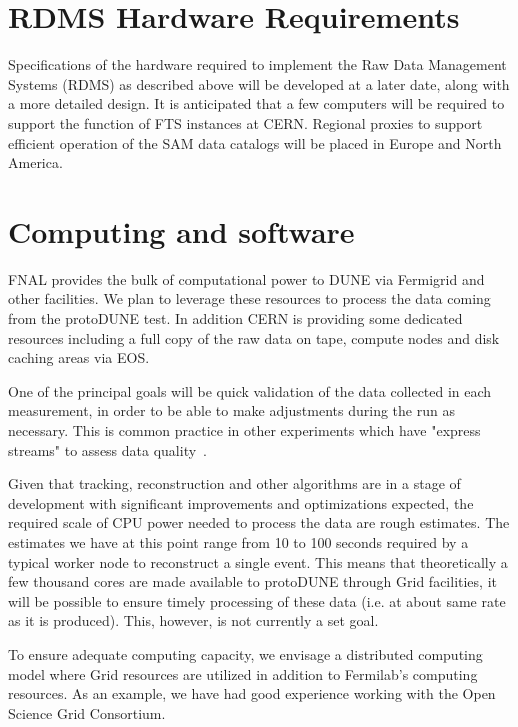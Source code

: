 \documentclass[12pt]{article}
\begin{document}
\section{RDMS Hardware Requirements}
Specifications of the hardware required to implement the Raw Data Management Systems (RDMS) as described above will be developed at a later date,
along with a more detailed design. It is anticipated that a few computers will be required to support the function of FTS instances at CERN.
Regional proxies to support efficient operation of the SAM data catalogs will be placed in Europe and North America.

\section{Computing and software}


FNAL provides the bulk of computational power to DUNE via Fermigrid and other facilities. 
We plan to leverage these resources to process the data coming from the protoDUNE test. In addition CERN is providing some dedicated resources including a full copy of the raw data on tape, compute nodes and disk caching areas via EOS.

One of the principal goals will be quick validation of the data collected in each measurement, in
order to be able to make adjustments during the run as necessary. 
This is common practice in other experiments which have "express streams" to assess data quality~\cite{atlas_express}.


Given that tracking, reconstruction and other algorithms are in a stage of development with significant improvements
and optimizations expected, the required scale of CPU power needed to process the data are rough estimates.
The estimates we have at this point range from 10 to 100 seconds required by a typical worker node to reconstruct
a single event.  This means that theoretically a few thousand cores are made available to protoDUNE through Grid facilities,
it will be possible to ensure timely processing of these data (i.e. at about same rate as it is produced). This, however, is not
currently a set goal.

To ensure adequate computing capacity, we envisage a distributed computing model where Grid resources are
utilized in addition to Fermilab's computing resources. As an example, we have had good experience working
with the Open Science Grid Consortium.
\end{document}
